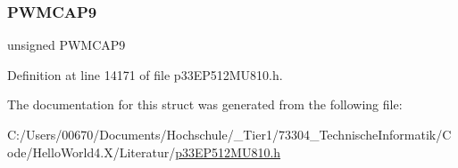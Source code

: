 \mbox{\label{structtag_p_w_m_c_a_p1_b_i_t_s_a9a0cd5d7a58681927adecfd9946b75fb}} 
\subsubsection{\texorpdfstring{P\+W\+M\+C\+A\+P9}{PWMCAP9}}
{\footnotesize\ttfamily unsigned P\+W\+M\+C\+A\+P9}



Definition at line 14171 of file p33\+E\+P512\+M\+U810.\+h.



The documentation for this struct was generated from the following file\+:\begin{DoxyCompactItemize}
\item 
C\+:/\+Users/00670/\+Documents/\+Hochschule/\+\_\+\+Tier1/73304\+\_\+\+Technische\+Informatik/\+Code/\+Hello\+World4.\+X/\+Literatur/\hyperlink{p33_e_p512_m_u810_8h}{p33\+E\+P512\+M\+U810.\+h}\end{DoxyCompactItemize}
